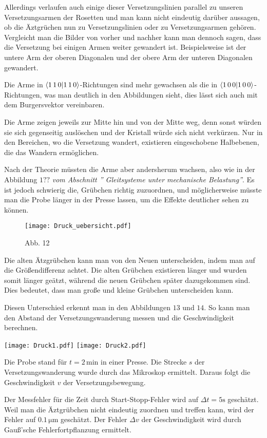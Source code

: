 \documentclass[12pt,a4paper]{scrartcl}
\numberwithin{equation}{section} %
\renewcommand{\[}{} %
\renewcommand{\]}{\noindent} %
\begin{document}
Allerdings verlaufen auch einige dieser Versetzungslinien parallel zu
unseren Versetzungsarmen der Rosetten und man kann nicht eindeutig
darüber aussagen, ob die Äztgrüchen nun zu Versetzungslinien oder zu
Versetzungsarmen gehören. Vergleicht man die Bilder von vorher und
nachher kann man dennoch sagen, dass die Versetzung bei einigen Armen
weiter gewandert ist. Beispielsweise ist der untere Arm der oberen
Diagonalen und der obere Arm der unteren Diagonalen gewandert.

Die Arme in \(\braket{1\,1\,0}\)-Richtungen sind mehr gewachsen als die
in \(\braket{1\,0\,0}\)-Richtungen, was man deutlich in den Abbildungen
sieht, dies lässt sich auch mit dem Burgersvektor vereinbaren.

Die Arme zeigen jeweils zur Mitte hin und von der Mitte weg, denn sonst
würden sie sich gegenseitig auslöschen und der Kristall würde sich nicht
verkürzen. Nur in den Bereichen, wo die Versetzung wandert, existieren
eingeschobene Halbebenen, die das Wandern ermöglichen.

Nach der Theorie müssten die Arme aber andersherum wachsen, also wie in
der Abbildung \(1??\) \emph{vom Abschnitt '' Gleitsysteme unter
mechanische Belastung''}. Es ist jedoch schwierig die, Grübchen richtig
zuzuordnen, und möglicherweise müsste man die Probe länger in der Presse
lassen, um die Effekte deutlicher sehen zu können.

\begin{figure}
\centering
\texttt{[image: Druck\_uebersicht.pdf]}
\caption{Abb. 12}
\end{figure}

Die alten Ätzgrübchen kann man von den Neuen unterscheiden, indem man
auf die Größendifferenz achtet. Die alten Grübchen existieren länger und
wurden somit länger geätzt, während die neuen Grübchen später
dazugekommen sind. Dies bedeutet, dass man große und kleine Grübchen
unterscheiden kann.

Diesen Unterschied erkennt man in den Abbildungen \(13\) und \(14\). So
kann man den Abstand der Versetzungswanderung messen und die
Geschwindigkeit berechnen.

\texttt{[image: Druck1.pdf]} \texttt{[image: Druck2.pdf]}

Die Probe stand für \(t=2\mathrm{\,min}\) in einer Presse. Die Strecke
\(s\) der Versetzungswanderung wurde durch das Mikroskop ermittelt.
Daraus folgt die Geschwindigkeit \(v\) der Versetzungsbewegung.

Der Messfehler für die Zeit durch Start-Stopp-Fehler wird auf
\(\Delta t=5\mathrm s\) geschätzt. Weil man die Äztgrübchen nicht
eindeutig zuordnen und treffen kann, wird der Fehler auf
\(0.1\mathrm{\,\mu m}\) geschätzt. Der Fehler \(\Delta v\) der
Geschwindigkeit wird durch Gauß'sche Fehlerfortpflanzung ermittelt.
\end{document}
